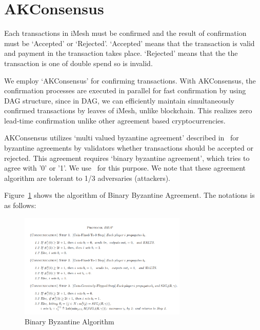 \documentclass[a4paper,10pt,twocolumn]{article}
\begin{document}
	\section{AKConsensus}
	\label{sec:AKConsensus}
	
	Each transactions in iMesh must be confirmed and the result of confirmation must be
	`Accepted' or `Rejected'. `Accepted' means that the transaction is valid and payment in the transaction takes place.
	`Rejected' means that the the transaction is one of double spend so is invalid. 

	We employ `AKConsensus' for confirming transactions. With AKConsensus, the confirmation processes
	are executed in parallel for fast confirmation by using DAG structure, since in DAG, we can efficiently maintain simultaneously
	confirmed transactions by leaves of iMesh,  unlike blockchain. This realizes zero lead-time confirmation unlike 
	other agreement based cryptocurrencies.

	AKConsensus utilizes  `multi valued byzantine agreement'
	described in~\cite{mba} for byzantine agreements by validators  whether transactions should be accepted or rejected.
	This agreement requires `binary byzantine agreement', which tries to agree with 
	'0' or '1'. We use~\cite{bba}  for this purpose. 
	We note that these agreement algorithm are tolerant to 1/3 adversaries (attackers).
	
	Figure~\ref{fig:bba} shows the algorithm of Binary Byzantine Agreement. The notations is as follows:

	\begin{figure}[ht]
		\begin{center}
		\includegraphics[width=80mm]{bba.png}
		  \caption{Binary Byzantine Algorithm}
		\label{fig:bba}
		\end{center}
	 \end{figure}
\end{document}
